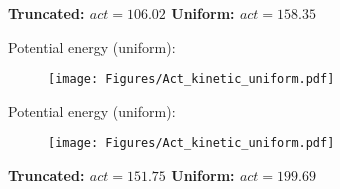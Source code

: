 \documentclass[12pt, two sided]{article}
\begin{document}
\textbf{Truncated: $act = 106.02$ Uniform: $act = 158.35$}

Potential energy (uniform):

\begin{figure}[h!]
\texttt{[image: Figures/Act\_kinetic\_uniform.pdf]}
\end{figure}

Potential energy (uniform):

\begin{figure}[h!]
\texttt{[image: Figures/Act\_kinetic\_uniform.pdf]}
\end{figure}

\textbf{Truncated: $act = 151.75$ Uniform: $act = 199.69$}



{} 
 \singlespacing


\doublespacing
\end{document}
